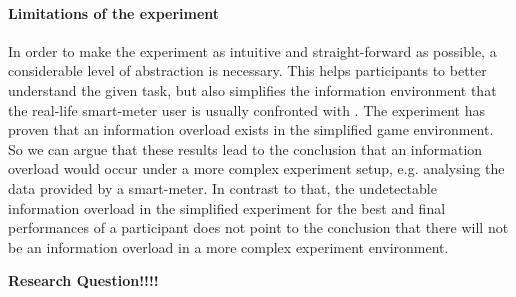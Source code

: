 \paragraph{Limitations of the experiment}
In order to make the experiment as intuitive and straight-forward as possible, a considerable level of abstraction is necessary. This helps participants to better understand the given task, but also simplifies the information environment that the real-life smart-meter user is usually confronted with \citep{Jacoby1984}. The experiment has proven that an information overload exists in the simplified game environment.  So we can argue that these results lead to the conclusion that an information overload would occur under a more complex experiment setup, e.g. analysing the data provided by a smart-meter. 
In contrast to that, the undetectable information overload in the simplified experiment for the best and final performances of a participant does not point to the conclusion that there will not be an information overload in a more complex experiment environment.


\textbf{Research Question!!!!}
%
%
%
%


